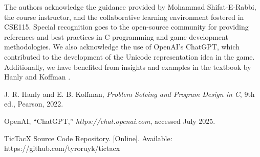 \documentclass[11pt,a4paper,twocolumn]{article}
\begin{document}
The authors acknowledge the guidance provided by Mohammad Shifat-E-Rabbi, the course instructor, and the collaborative learning environment fostered in CSE115. Special recognition goes to the open-source community for providing references and best practices in C programming and game development methodologies. We also acknowledge the use of OpenAI's ChatGPT, which contributed to the development of the Unicode representation idea in the game. Additionally, we have benefited from insights and examples in the textbook by Hanly and Koffman \cite{hanly2022}.

\begin{thebibliography}{9}

J. R. Hanly and E. B. Koffman, \textit{Problem Solving and Program Design in C}, 9th ed., Pearson, 2022.

OpenAI, ``ChatGPT,'' \textit{https://chat.openai.com}, accessed July 2025.

TicTacX Source Code Repository. [Online]. Available: https://github.com/tyroruyk/tictacx

\end{thebibliography}
\end{document}
